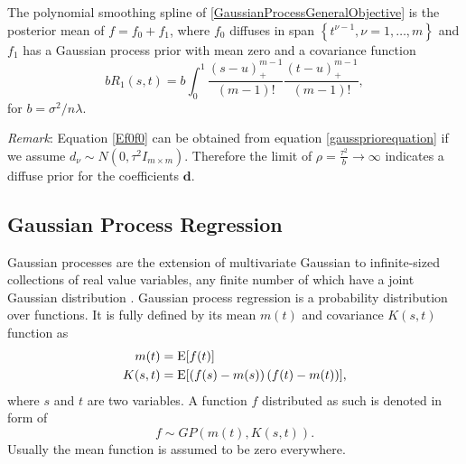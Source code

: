 \begin{theorem}\citep{gu2013smoothing}
The polynomial smoothing spline of \eqref{GaussianProcessGeneralObjective} is the posterior mean of $f = f_0 +f_1$, where $f_0$ diffuses in span $\left\lbrace t^{\nu-1}, \nu= 1, \ldots , m\right\rbrace$ and $f_1$ has a Gaussian process prior with mean zero and a covariance function
\begin{equation}
bR_1(s,t) = b\int_{0}^{1} \frac{\left(s-u\right)_+^{m-1}}{(m-1)!} \frac{\left(t-u\right)_+^{m-1}}{(m-1)!},
\end{equation}
for $b=\sigma^2/n\lambda$. 
\end{theorem}

\textit{Remark}: Equation \eqref{Ef0f0} can be obtained from equation \eqref{gausspriorequation} if we assume $d_\nu \sim N\left(0,\tau^2I_{m\times m}\right)$. Therefore the limit of $\rho=\frac{\tau^2}{b}\to\infty$ indicates a diffuse prior for the coefficients $\mathbf{d}$. 


\subsection{Gaussian Process Regression}

Gaussian processes are the extension of multivariate Gaussian to infinite-sized collections of real value variables, any finite number of which have a joint Gaussian distribution \citep{rasmussen2006gaussian}. Gaussian process regression is a probability distribution over functions. It is fully defined by its mean $m(t)$ and covariance $K(s,t)$ function as 
\begin{align}
m(t)&=\mathrm{E} \lbrack f(t)\rbrack \\
K(s,t)&=\mathrm{E} \lbrack \left(f(s)-m(s)\right) \left(f(t)-m(t)\right)\rbrack,
\end{align}
where $s$ and $t$ are two variables. A function $f$ distributed as such is denoted in form of 
\begin{equation}
f \sim GP\left(m(t),K(s,t) \right).
\end{equation}
Usually the mean function is assumed to be zero everywhere. 

